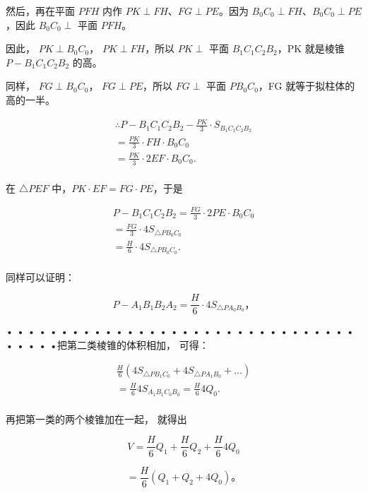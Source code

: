 然后，再在平面 \(PFH\) 内作 \(PK \perp FH\)、\(FG \perp PE\)。因为
\(B_0C_0 \perp FH\)、\(B_0C_0 \perp PE\)，因此 \(B_0C_0 \perp\) 平面
\(PFH\)。

因此， \(PK \perp B_{0}C_{0}\)， \(PK \perp FH\)，所以 \(PK \perp\) 平面
\(B_{1}C_{1}C_{2}B_{2}\)，PK 就是棱锥 \(P-B_{1}C_{1}C_{2}B_{2}\) 的高。

同样， \(FG \perp B_{0}C_{0}\)， \(FG \perp PE\)，所以 \(FG \perp\) 平面
\(PB_{0}C_{0}\)，FG 就等于拟柱体的高的一半。

\[
\begin{array}{l} \therefore P - B _ {1} C _ {1} C _ {2} B _ {2} - \frac {P K}{3} \cdot S _ {B _ {1} C _ {1} C _ {2} B _ {2}} \\ = \frac {P K}{3} \cdot F H \cdot B _ {0} C _ {0} \\ = \frac {P K}{3} \cdot 2 E F \cdot B _ {0} C _ {0}. \\ \end{array}
\]

在 \(\triangle PEF\) 中，\(PK \cdot EF = FG \cdot PE\)，于是

\[
\begin{array}{l} P - B _ {1} C _ {1} C _ {2} B _ {2} = \frac {F G}{3} \cdot 2 P E \cdot B _ {0} C _ {0} \\ = \frac {F G}{3} \cdot 4 S _ {\triangle P B _ {0} C _ {0}} \\ = \frac {H}{6} \cdot 4 S _ {\triangle P B _ {0} C _ {0}}. \\ \end{array}
\]

同样可以证明：

\[
P - A _ {1} B _ {1} B _ {2} A _ {2} = \frac {H}{6} \cdot 4 S _ {\triangle P A _ {0} B _ {0}}\text{，}
\]

• • • • • • • • • • • • • • • • • • • • • • • • • • • • • • • • • • • •
•把第二类棱锥的体积相加， 可得：

\[
\begin{array}{l} \frac {H}{6} \left(4 S _ {\triangle P B _ {1} C _ {0}} + 4 S _ {\triangle P A _ {1} B _ {0}} + \dots\right) \\ = \frac {H}{6} 4 S _ {A _ {1} B _ {1} C _ {0} B _ {0}} = \frac {H}{6} 4 Q _ {0}. \\ \end{array}
\]

再把第一类的两个棱锥加在一起， 就得出

\[
V = \frac {H}{6} Q _ {1} + \frac {H}{6} Q _ {2} + \frac {H}{6} 4 Q _ {0}
\]

\[
= \frac {H}{6} \left(Q _ {1} + Q _ {2} + 4 Q _ {0}\right)\text{。}
\]

